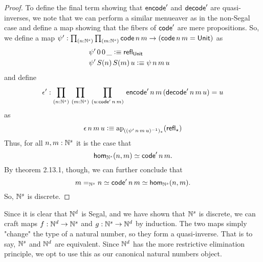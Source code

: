 \documentclass[main.tex]{subfiles}
\begin{document}
\begin{proof}
    To define the final term showing that $\eco'$ and $\dco'$ are quasi-inverses, we note that we can perform a similar
    menueaver as in the non-Segal case and define a map showing that the fibers of $\co'$ are mere propositions. So, we define a map
     $\psi' : \prd{n : \Ns}{m : \Ns}\co\,n\,m \to (\co\,n\,m = \Un)$ as
    \begin{align*}
        &\psi'\,0\,0\,\_\defeq \refl{\Un}\\
        &\psi'\,S(n)\,S(m)\,u\defeq\psi\,n\,m\,u&
    \end{align*}
    and define 
$$\epsilon' : \prd{n:\Ns}{m:\Ns}{u : \co' \, n\, m}\eco'\,n\,m\,(\dco'\,n\,m \,u) =u$$
as
\begin{align*}
    \epsilon\,n\,m\,u \defeq \text{ap}_{((\psi'\,n\,m\,u)^{-1})_*}(\refl{\star})
\end{align*}
    Thus, for all $n,m : \Ns$ it is the case that
    $$\ho[\Ns]{n}{m}\simeq \co'\,n\,m.$$
    By \cite{program_homotopy_2013} theorem 2.13.1, though, we can further conclude that 
    $$m=_{\Ns} n \simeq \co'\,n\,m \simeq \ho[\Ns]{n}{m}.$$
    So, $\Ns$ is discrete.
\end{proof}

Since it is clear that $\Nd$ is Segal, and we have shown that $\Ns$ is discrete, we can craft maps
$f : \Nd \to \Ns$ and $g : \Ns \to \Nd$ by induction. The two maps simply "change" the type of a natural number, so they
form a quasi-inverse. That is to say, $\Ns$ and $\Nd$ are equivalent. Since $\Nd$ has the more restrictive elimination principle,
we opt to use this as our canonical natural numbers object. 
\end{document}
